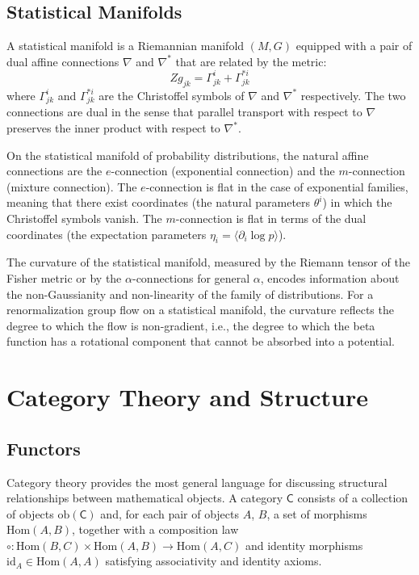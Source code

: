 \documentclass[11pt, twoside, openright]{book}
\theoremstyle{dotted}
\theoremstyle{definition}
\begin{document}
\section{Statistical Manifolds}

A statistical manifold is a Riemannian manifold $(M, G)$ equipped with a pair of
dual affine connections $\nabla$ and $\nabla^*$ that are related by the metric:
\begin{equation}
  Zg_{jk} = \Gamma^i_{jk} + \Gamma^{*i}_{jk}
  \label{eq:dual_connections}
\end{equation}
where $\Gamma^i_{jk}$ and $\Gamma^{*i}_{jk}$ are the Christoffel symbols of $\nabla$
and $\nabla^*$ respectively. The two connections are dual in the sense that parallel
transport with respect to $\nabla$ preserves the inner product with respect to
$\nabla^*$.

On the statistical manifold of probability distributions, the natural affine
connections are the $e$-connection (exponential connection) and the $m$-connection
(mixture connection). The $e$-connection is flat in the case of exponential families,
meaning that there exist coordinates (the natural parameters $\theta^i$) in which
the Christoffel symbols vanish. The $m$-connection is flat in terms of the dual
coordinates (the expectation parameters $\eta_i = \langle\partial_i\log p\rangle$).

The curvature of the statistical manifold, measured by the Riemann tensor of the
Fisher metric or by the $\alpha$-connections for general $\alpha$, encodes
information about the non-Gaussianity and non-linearity of the family of
distributions. For a renormalization group flow on a statistical manifold, the
curvature reflects the degree to which the flow is non-gradient, i.e., the degree
to which the beta function has a rotational component that cannot be absorbed into
a potential.

\chapter{Category Theory and Structure}
\label{ch:category_theory}

\section{Functors}

Category theory provides the most general language for discussing structural
relationships between mathematical objects. A category $\mathsf{C}$ consists of a
collection of objects $\mathrm{ob}(\mathsf{C})$ and, for each pair of objects $A$, $B$,
a set of morphisms $\mathrm{Hom}(A, B)$, together with a composition law
$\circ: \mathrm{Hom}(B,C) \times \mathrm{Hom}(A,B) \to \mathrm{Hom}(A,C)$
and identity morphisms $\mathrm{id}_A \in \mathrm{Hom}(A,A)$ satisfying associativity
and identity axioms.
\end{document}
